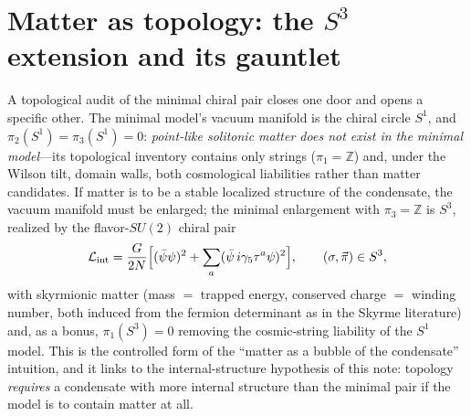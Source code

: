 \documentclass[11pt,a4paper]{article}
\begin{document}
\section{Matter as topology: the $S^3$ extension and its gauntlet}
\label{sec:s3}

A topological audit of the minimal chiral pair closes one door and
opens a specific other.  The minimal model's vacuum manifold is the
chiral circle $S^1$, and $\pi_2(S^1) = \pi_3(S^1) = 0$:
\emph{point-like solitonic matter does not exist in the minimal
model}---its topological inventory contains only strings
($\pi_1 = \mathbb{Z}$) and, under the Wilson tilt, domain walls,
both cosmological liabilities rather than matter candidates.
If matter is to be a stable localized structure of the condensate,
the vacuum manifold must be enlarged; the minimal enlargement with
$\pi_3 = \mathbb{Z}$ is $S^3$, realized by the flavor-$SU(2)$
chiral pair
\begin{equation}
\mathcal{L}_{\rm int} = \frac{G}{2N}\Bigl[(\bar\psi\psi)^2
+ \sum_a (\bar\psi\, i\gamma_5\tau^a\psi)^2\Bigr],
\qquad (\sigma,\vec\pi) \in S^3,
\label{eq:su2pair}
\end{equation}
with skyrmionic matter (mass $=$ trapped energy, conserved charge
$=$ winding number, both induced from the fermion determinant as
in the Skyrme literature) and, as a bonus, $\pi_1(S^3) = 0$
removing the cosmic-string liability of the $S^1$ model.
This is the controlled form of the ``matter as a bubble of the
condensate'' intuition, and it links to the internal-structure
hypothesis of this note: topology \emph{requires} a condensate
with more internal structure than the minimal pair if the model is
to contain matter at all.
\end{document}
